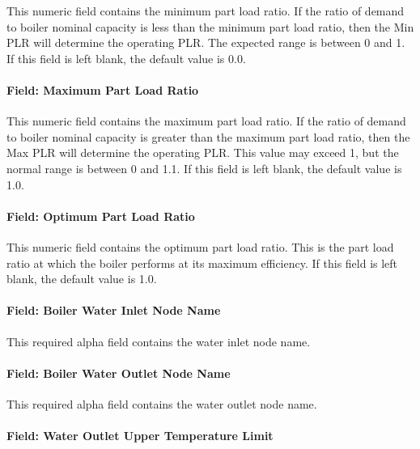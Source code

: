 This numeric field contains the minimum part load ratio. If the ratio of demand to boiler nominal capacity is less than the minimum part load ratio, then the Min PLR will determine the operating PLR. The expected range is between 0 and 1. If this field is left blank, the default value is 0.0.

\paragraph{Field: Maximum Part Load Ratio}\label{field-maximum-part-load-ratio-9}

This numeric field contains the maximum part load ratio. If the ratio of demand to boiler nominal capacity is greater than the maximum part load ratio, then the Max PLR will determine the operating PLR. This value may exceed 1, but the normal range is between 0 and 1.1. If this field is left blank, the default value is 1.0.

\paragraph{Field: Optimum Part Load Ratio}\label{field-optimum-part-load-ratio-9}

This numeric field contains the optimum part load ratio. This is the part load ratio at which the boiler performs at its maximum efficiency. If this field is left blank, the default value is 1.0.

\paragraph{Field: Boiler Water Inlet Node Name}\label{field-boiler-water-inlet-node-name}

This required alpha field contains the water inlet node name.

\paragraph{Field: Boiler Water Outlet Node Name}\label{field-boiler-water-outlet-node-name}

This required alpha field contains the water outlet node name.

\paragraph{Field: Water Outlet Upper Temperature Limit}\label{field-water-outlet-upper-temperature-limit-000}

